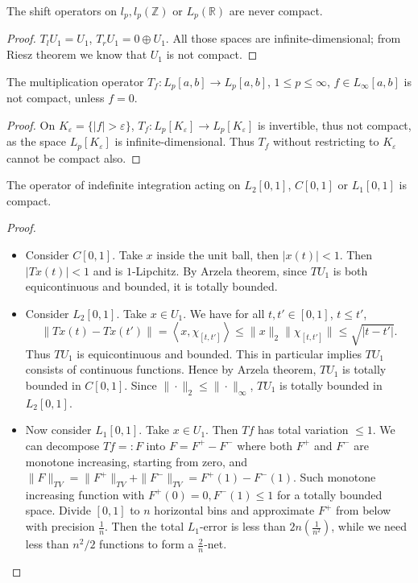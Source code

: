 \begin{proposition}
	\label{prop:ShiftOperatorNotCompact}
	The shift operators on $l_p, l_p(\mathbb{Z})$ or $L_p(\mathbb{R})$ are never compact.
\end{proposition}
\begin{proof}
	$T_l U_1 = U_1$, $T_r U_1 = 0 \oplus U_1$. All those spaces are infinite-dimensional; from Riesz theorem we know that $U_1$ is not compact.
\end{proof}


\begin{proposition}
	\label{prop:MultOperatorNotCompact}
	The multiplication operator $T_f: L_p[a, b] \to L_p[a, b]$, $1 \le p \le \infty $, $f \in L_\infty [a, b]$ is not compact, unless $f = 0$.
\end{proposition}
\begin{proof}
	On $K_\varepsilon = \{|f| > \varepsilon\} $, $T_f: L_p[K_\varepsilon] \to L_p[K_\varepsilon]$ is invertible, thus not compact, as the space $L_p[K_\varepsilon]$ is infinite-dimensional. Thus $T_f$ without restricting to $K_\varepsilon$ cannot be compact also.
\end{proof}


\begin{proposition}
	\label{prop:IndefIntCompact}
	The operator of indefinite integration acting on $L_2[0,1]$, $C[0,1]$ or $L_1[0,1]$ is compact.
\end{proposition}
\begin{proof}
	\begin{itemize}
		\item Consider $C[0,1]$. Take $x$ inside the unit ball, then $|x(t)| < 1$. Then  $|Tx(t)| < 1$ and is $1$-Lipchitz. By Arzela theorem, since $T U_1$ is both equicontinuous and bounded, it is totally bounded.

		\item Consider $L_2[0,1]$. Take $x \in U_1$. We have for all $t, t' \in [0,1]$, $t \le t'$,
			\[
				\|Tx(t) - T x(t')\| = \left\langle x, \chi_{[t, t']} \right\rangle 
				\le \|x\|_2 \|\chi_{[t, t']}\|
				\le \sqrt{\left| t - t' \right| } 
			.\] 
			Thus $T U_1$ is equicontinuous and bounded. This in particular implies $T U_1$ consists of continuous functions. Hence by Arzela theorem,  $T U_1$ is totally bounded in $C[0,1]$. Since $\|\cdot \|_2 \le \|\cdot \|_\infty $, $T U_1$ is totally bounded in $L_2[0,1]$.
		\item Now consider $L_1[0,1]$. Take $x \in U_1$. Then $T f$ has total variation $\le 1$. We can decompose $Tf=:F$ into $F = F^+ - F^-$ where both  $F^+$ and $F^-$ are monotone increasing, starting from zero, and $\|F\|_{TV} = \|F^+\|_{TV} + \|F^-\|_{TV} = F^+(1) - F^-(1)$. Such monotone increasing function with $F^+(0) = 0, F^-(1) \le 1$ for a totally bounded space. Divide $[0,1]$ to $n$ horizontal bins and approximate $F^+$ from below with precision $\frac{1}{n}$. Then the total $L_1$-error is less than $2n (\frac{1}{n^2})$, while we need less than $n^2 / 2$ functions to form a $\frac{2}{n}$-net.
	\end{itemize}
\end{proof}



